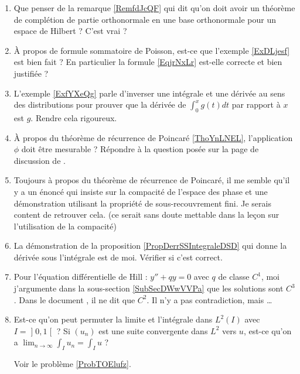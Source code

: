 \begin{enumerate}
    \item
        Que penser de la remarque \ref{RemfdJcQF} qui dit qu'on doit avoir un théorème de complétion de partie orthonormale en une base orthonormale pour un espace de Hilbert ? C'est vrai ?
    \item
        À propos de formule sommatoire de Poisson, est-ce que l'exemple \ref{ExDLjesf} est bien fait ? En particulier la formule \eqref{EqjrNxLr} est-elle correcte et bien justifiée ?
    \item 
        L'exemple \ref{ExfYXeQg} parle d'inverser une intégrale et une dérivée au sens des distributions pour prouver que la dérivée de \( \int_0^xg(t)dt\) par rapport à \( x\) est \( g\). Rendre cela rigoureux.
    \item
        À propos du théorème de récurrence de Poincaré \ref{ThoYnLNEL}, l'application \( \phi\) doit être mesurable ? Répondre à la question posée sur la page de discussion de .
    \item
        Toujours à propos du théorème de récurrence de Poincaré, il me semble qu'il y a un énoncé qui insiste sur la compacité de l'espace des phase et une démonstration utilisant la propriété de sous-recouvrement fini. Je serais content de retrouver cela. (ce serait sans doute mettable dans la leçon sur l'utilisation de la compacité)
    \item
        La démonstration de la proposition \ref{PropDerrSSIntegraleDSD} qui donne la dérivée sous l'intégrale est de moi. Vérifier si c'est correct.
    \item
        Pour l'équation différentielle de Hill : \( y''+qy=0\) avec \( q\) de classe \( C^1\), moi j'argumente dans la sous-section \ref{SubSecDWwVVPa} que les solutions sont \( C^3\). Dans le document \cite{KXjFWKA}, il ne dit que \( C^2\). Il n'y a pas contradiction, mais \ldots
    \item 
        Est-ce qu'on peut permuter la limite et l'intégrale dans \( L^2(I)\) avec \( I=\mathopen] 0 , 1 \mathclose[\) ? Si \( (u_n)\) est une suite convergente dans \( L^2\) vers \( u\), est-ce qu'on a \( \lim_{n\to \infty} \int_Iu_n=\int_Iu\) ?

            Voir le problème \ref{ProbTOElufz}.


\end{enumerate}
